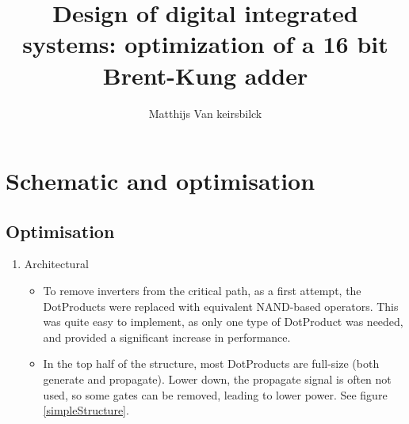 \documentclass[english]{article}
\begin{document}
\title{Design of digital integrated systems: optimization of a 16 bit Brent-Kung adder}
\author{Matthijs Van keirsbilck}

\maketitle

\section{Schematic and optimisation}

\subsection{Optimisation}

\begin{enumerate}
\item Architectural \label{itm:arch}

\begin{itemize}
\item To remove inverters from the critical path, as a first attempt, the DotProducts were replaced with equivalent NAND-based operators. This was quite easy to implement, as only one type of DotProduct was needed, and provided a significant increase in performance. 

\item In the top half of the structure, most DotProducts are full-size (both generate and propagate).
Lower down, the propagate signal is often not used, so some gates can be removed, leading to lower power. See figure \ref{simpleStructure}.


\end{itemize}
\end{enumerate}
\end{document}
